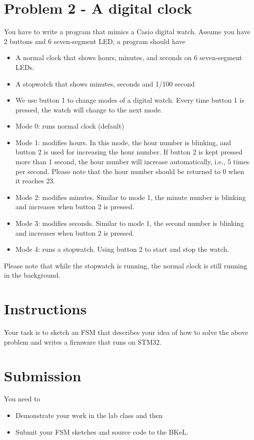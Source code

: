 \section{Problem 2 - A digital clock}
 You have to write a program that mimics a Casio digital watch. Assume you have 2 buttons and 6 seven-segment LED, a program should have
\begin{itemize}
    \item A normal clock that shows hours, minutes, and seconds on 6 seven-segment LEDs.
    \item  A stopwatch that shows minutes, seconds and 1/100 second
    \item We use button 1 to change modes of a digital watch. Every time button 1 is pressed, the watch will change to the next mode.
    \item Mode 0: runs normal clock (default)
    \item Mode 1: modifies hours. In this mode, the hour number is blinking, and button 2 is used for increasing the hour number.  If button 2 is kept pressed more than 1 second, the hour number will increase automatically, i.e., 5 times per second. Please note that the hour number should be returned to 0 when it reaches 23.
    \item  Mode 2: modifies minutes. Similar to mode 1, the minute number is blinking and increases when button 2 is pressed.
    \item Mode 3: modifies seconds. Similar to mode 1, the second number is blinking and increases when button 2 is pressed.
    \item Mode 4: runs a stopwatch. Using button 2 to start and stop the watch.  
 
\end{itemize}
 Please note that while the stopwatch is running, the normal clock is still running in the background.


 

\section{Instructions}

Your task is to sketch an FSM that describes your idea of how to solve the above problem and  writes a firmware that runs on STM32.



 

\section{Submission}

You need to
\begin{itemize}
    \item Demonstrate your work in the lab class and then
    \item  Submit your FSM sketches and source code to the BKeL.
\end{itemize}
